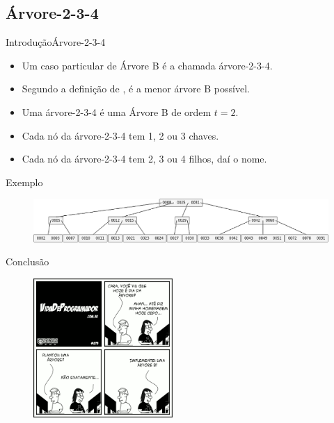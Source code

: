 \documentclass[aspectratio=169]{beamer}
\begin{document}
{%
\subsection{Árvore-2-3-4}

\begin{frame}{Introdução}{Árvore-2-3-4}
\begin{itemize}
 \item Um caso particular de Árvore B é a chamada árvore-2-3-4.
 \item Segundo a definição de \cite{Cormen2012}, é a menor árvore B possível.
 \item Uma árvore-2-3-4 é uma Árvore B de ordem $t = 2$.
 \item Cada nó da árvore-2-3-4 tem 1, 2 ou 3 chaves.
 \item Cada nó da árvore-2-3-4 tem 2, 3 ou 4 filhos, daí o nome.
\end{itemize}
\end{frame}


\begin{frame}{Exemplo}
\begin{figure}[!h]
\centering
   \includegraphics[width=350pt]{imagens/arvore-2-3-4.png}
  \label{fig_arvore-2-3-4}
\end{figure} 
\end{frame}



\begin{frame}{Conclusão}

\begin{figure}[!h]
  \centering
  \includegraphics[width=150pt]{imagens/tirinha273.png}
  \label{fig_tirinha}
\end{figure}
\end{frame}

}
\end{document}
